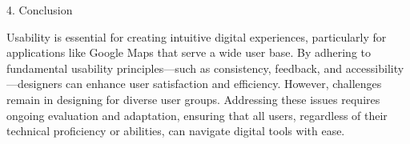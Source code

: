 4. Conclusion

Usability is essential for creating intuitive digital experiences, particularly for applications like Google Maps that serve a wide user base. By adhering to fundamental usability principles—such as consistency, feedback, and accessibility—designers can enhance user satisfaction and efficiency. However, challenges remain in designing for diverse user groups. Addressing these issues requires ongoing evaluation and adaptation, ensuring that all users, regardless of their technical proficiency or abilities, can navigate digital tools with ease.


\newpage
